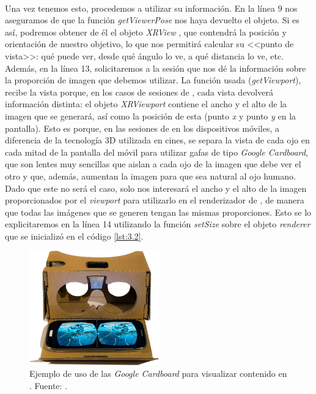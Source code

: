 \documentclass{subfiles}
\begin{document}
        \paragraph{}
        Una vez tenemos esto, procedemos a utilizar su información. En la línea 9 nos aseguramos de que la función \textit{getViewerPose} nos haya devuelto el objeto. Si es así, podremos obtener de él el objeto \textit{XRView} \cite{web:mozilla_xrview}, que contendrá la posición y orientación de nuestro objetivo, lo que nos permitirá calcular su <<punto de vista>>: qué puede ver, desde qué ángulo lo ve, a qué distancia lo ve, etc. Además, en la línea 13, solicitaremos a la sesión que nos dé la información sobre la proporción de imagen que debemos utilizar. La función usada (\textit{getViewport}), recibe la vista porque, en los casos de sesiones de \rv, cada vista devolverá información distinta: el objeto \textit{XRViewport} contiene el ancho y el alto de la imagen que se generará, así como la posición de esta (punto \textit{x} y punto \textit{y} en la pantalla). Esto es porque, en las sesiones de \ra en los dispositivos móviles, a diferencia de la tecnología 3D utilizada en cines, se separa la vista de cada ojo en cada mitad de la pantalla del móvil para utilizar gafas de tipo \textit{Google Cardboard}, que son lentes muy sencillas que aislan a cada ojo de la imagen que debe ver el otro y que, además, aumentan la imagen para que sea natural al ojo humano. Dado que este no será el caso, solo nos interesará el ancho y el alto de la imagen proporcionados por el \textit{viewport} para utilizarlo en el renderizador de \threejs, de manera que todas las imágenes que se generen tengan las mismas proporciones. Esto se lo explicitaremos en la línea 14 utilizando la función \textit{setSize} sobre el objeto \textit{renderer} que se inicializó en el código \ref{lst:3.2}.

\begin{figure}
\centering
\includegraphics[width=0.5\textwidth]{img/google_cardboard.jpg}
\caption{Ejemplo de uso de las \textit{Google Cardboard} para visualizar contenido en \rv. Fuente: .}
\label{fig:google_cardboard}
\end{figure}
\end{document}
